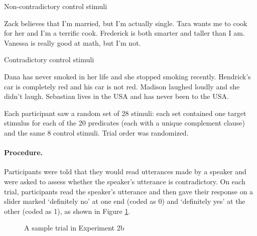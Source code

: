 \documentclass[11pt,fleqn]{article}
\newcommand{\6}{\mbox{$[\hspace*{-.6mm}[$}}
\newcommand{\9}{\mbox{$]\hspace*{-.6mm}]$}}
\begin{document}
{\begin{exe}
\ex\label{control-good} Non-contradictory control stimuli
\begin{xlist}
\ex Zack believes that I'm married, but I'm actually single.
\ex Tara wants me to cook for her and I'm a terrific cook.
\ex Frederick is both smarter and taller than I am.
\ex Vanessa is really good at math, but I'm not.
\end{xlist}
\ex\label{control-bad} Contradictory control stimuli
\begin{xlist}
\ex Dana has never smoked in her life and she stopped smoking recently.
\ex Hendrick's car is completely red and his car is not red.
\ex Madison laughed loudly and she didn't laugh.
\ex Sebastian lives in the USA and has never been to the USA.
\end{xlist}
\end{exe}

Each participant saw a random set of 28 stimuli: each set contained one target stimulus for each of the 20 predicates (each with a unique complement clause) and the same 8 control stimuli. Trial order was randomized.


\paragraph{Procedure.} Participants were told that they would read utterances made by a speaker and were asked to assess whether the speaker's utterance is contradictory. On each trial, participants read the speaker's utterance and then gave their response on a slider marked `definitely no' at one end (coded as 0) and `definitely yes' at the other (coded as 1), as shown in Figure \ref{f-trial-exp2}.

\begin{figure}[h!]
\begin{center}
\end{center}
\caption{A sample trial in Experiment 2b}\label{f-trial-exp2}
\end{figure}

}
\end{document}
